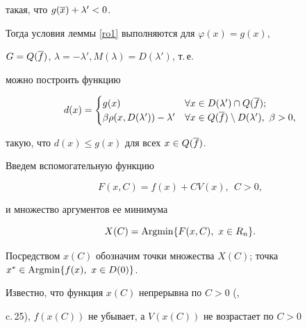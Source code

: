 \begin{pf}
такая, что $g(\overline x)+\lambda'<0$.





Тогда условия леммы \ref{ro1} выполняются для $\varphi(x)=g(x)$,


$G=Q(\overline f)$, $\lambda=-\lambda', M(\lambda)=D(\lambda')$, т.\,е.


можно построить функцию


$$




d(x)=\begin{cases}


g(x) & \forall x\in D(\lambda')\cap Q(\o f);\\


\beta\rho(x,D(\lambda'))-\lambda'


& \forall x\in Q(\o f)\setminus D(\lambda'),\ \beta>0,


\end{cases}




$$


такую, что $d(x)\leq g(x)$ для всех $x\in Q(\overline f)$.


\end{pf}





Введем вспомогательную функцию


\begin{equation}


F(x,C)=f(x)+C V(x), \ \ C>0, \label{F}


\end{equation}


и множество аргументов ее минимума


\begin{equation}


X(C)=\Argmin\{F(x,C),\ x\in R_n\}.\label{xC}


\end{equation}


Посредством $x(C)$ обозначим точки множества $X(C)$; точка $x^*\in\Argmin


\{f(x),\ x\in D(0)\}$.





Известно, что функция $x(C)$ непрерывна по $C>0$ (\cite{Dav},


c.\,25), $f(x(C))$ не убывает, а $V(x(C))$ не возрастает по $C>0$


